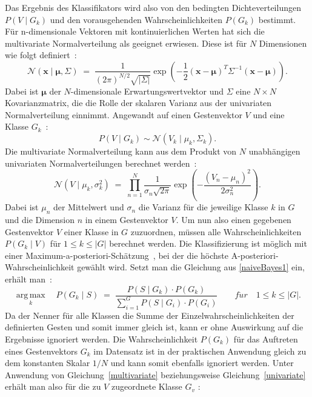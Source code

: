 Das Ergebnis des Klassifikators wird also von den bedingten Dichteverteilungen $P(V\mid G_k)$ und den vorausgehenden Wahrscheinlichkeiten $P(G_k)$ bestimmt. Für n-dimensionale Vektoren mit kontinuierlichen Werten hat sich die multivariate Normalverteilung als geeignet erwiesen. Diese ist für $N$ Dimensionen wie folgt definiert~\cite{flexibleSystem}:
\begin{equation}
    {\mathcal {N}}(\mathbf{x} \mid \mathbf{\mu}, \Sigma) \; = \; \frac{1}{(2\pi)^{N/2} \sqrt{\lvert\Sigma\rvert}} \exp{ \left( -\frac{1}{2}(\mathbf{x} - \mathbf{\mu})^T \Sigma^{-1} (\mathbf{x} - \mathbf{\mu}) \right)}.
\end{equation}
Dabei ist $\mathbf{\mu}$ der $N$-dimensionale Erwartungswertvektor und $\Sigma$ eine $N\times N$ Kovarianzmatrix, die die Rolle der skalaren Varianz aus der univariaten Normalverteilung einnimmt. Angewandt auf einen Gestenvektor $V$ und eine Klasse $G_k$~\cite{gillianANBC}:
\begin{equation} \label{multivariate} 
    {P(V\mid G_k)} \sim {\mathcal {N}}({V_k \mid \mu_k, \Sigma_k} ).
\end{equation}
Die multivariate Normalverteilung kann aus dem Produkt von $N$ unabhängigen univariaten Normalverteilungen berechnet werden~\cite{gillianANBC}:
\begin{equation} \label{univariate}
    \mathcal {N}(V\mid \mu_k ,\sigma^{2}_k) \; = \; \prod_{n=1}^N {\frac {1}{\sigma_{n} \sqrt {2\pi}}}\operatorname {exp} \left(-{\frac {(V_n-\mu_{n} )^{2}}{2\sigma^{2}_{n}}}\right).
\end{equation}
Dabei ist $\mu_{n}$ der Mittelwert und $\sigma_{n}$ die Varianz für die jeweilige Klasse $k$ in $G$ und die Dimension $n$ in einem Gestenvektor $V$. Um nun also einen gegebenen Gestenvektor $V$ einer Klasse in $G$ zuzuordnen, müssen alle Wahrscheinlichkeiten $P(G_k\mid V)$ für $1\leq k\leq |G|$ berechnet werden. Die Klassifizierung ist möglich mit einer Maximum-a-posteriori-Schätzung~\cite{gillianANBC}, bei der die höchste A-posteriori-Wahrscheinlichkeit gewählt wird. Setzt man die Gleichung aus \eqref{naiveBayes1} ein, erhält man~\cite{gillianANBC}: 
\begin{equation}
    {\underset {k}{\operatorname {arg\,max} }\quad
        P(G_k\mid S) \; = \; \frac{P(S\mid G_k)\cdot P(G_k)}{\sum_{i=1} ^{G} P(S\mid G_i) \cdot P(G_i)}}\qquad
    f\ddot{u}r\quad 1\leq k\leq |G|.
\end{equation}
Da der Nenner für alle Klassen die Summe der Einzelwahrscheinlichkeiten der definierten Gesten und somit immer gleich ist, kann er ohne Auswirkung auf die Ergebnisse ignoriert werden. Die Wahrscheinlichkeit $P(G_k)$ für das Auftreten eines Gestenvektors $G_k$ im Datensatz ist in der praktischen Anwendung gleich zu dem konstanten Skalar $1/N$ und kann somit ebenfalls ignoriert werden. Unter Anwendung von Gleichung~\eqref{multivariate} beziehungsweise Gleichung~\eqref{univariate} erhält man also für die zu $V$ zugeordnete Klasse $G_v$ \cite{gillianANBC}:
